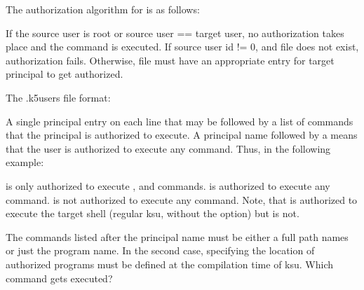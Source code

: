 \documentclass[letterpaper,10pt,english]{sphinxmanual}
\begin{document}
\begin{description}
\begin{sphinxVerbatim}[commandchars=\\\{\}]
    
\end{sphinxVerbatim}

\sphinxAtStartPar
The authorization algorithm for  is as follows:

\sphinxAtStartPar
If the source user is root or source user == target user, no
authorization takes place and the command is executed.  If source
user id != 0, and  file does not exist,
authorization fails.  Otherwise,  file
must have an appropriate entry for target principal to get
authorized.

\sphinxAtStartPar
The .k5users file format:

\sphinxAtStartPar
A single principal entry on each line that may be followed by a
list of commands that the principal is authorized to execute.  A
principal name followed by a \sphinxcode{\sphinxupquote{*}} means that the user is
authorized to execute any command.  Thus, in the following
example:

\begin{sphinxVerbatim}[commandchars=\\\{\}]
   
 
\end{sphinxVerbatim}

\sphinxAtStartPar
{} is only authorized to execute ,
 and  commands.   is
authorized to execute any command.   is
not authorized to execute any command.  Note, that
 is authorized to execute the target
shell (regular ksu, without the  option) but
 is not.

\sphinxAtStartPar
The commands listed after the principal name must be either a full
path names or just the program name.  In the second case,
 specifying the location of authorized programs must
be defined at the compilation time of ksu.  Which command gets
executed?


\end{description}
\end{document}
